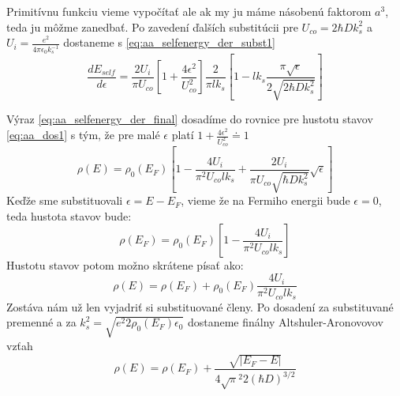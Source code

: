 Primitívnu funkciu vieme vypočítať ale ak my ju máme násobenú faktorom $a^3$, teda ju môžme zanedbať.
Po zavedení ďalších substitúcii pre $U_{co}=2\hbar D k_s^2$ a $U_i=\frac{e^2}{4\pi \epsilon_0 k_s^{-1}}$ dostaneme s
\eqref{eq:aa_selfenergy_der_subst1}
\begin{equation}
\label{eq:aa_selfenergy_der_final}
\frac{dE_{self}}{d\epsilon}=\frac{2 U_i}{\pi U_{co}}[1+\frac{4 \epsilon^2}{U_{co}^2}]\frac{2}{\pi l k_s}[1-l k_s \frac{\pi\sqrt\epsilon}{2\sqrt{2\hbar D k_s^2}}]
\end{equation}

Výraz \eqref{eq:aa_selfenergy_der_final} dosadíme do rovnice pre hustotu stavov \eqref{eq:aa_dos1} s tým, že
pre malé $\epsilon$ platí $1+\frac{4 \epsilon^2}{U_{co}^2}\doteq 1$
\begin{equation}
 \label{eq:aa_dos3}
 \rho(E)=\rho_0(E_F)[1-\frac{4 U_i}{\pi^2 U_{co} lk_s}+\frac{2U_i }{\pi U_{co} \sqrt{\hbar Dk_s^2}}\sqrt\epsilon ]
\end{equation}
Keďže sme substituovali $\epsilon=E-E_F$, vieme že na Fermiho energii bude $\epsilon=0$, teda hustota stavov bude:
\begin{equation}
 \label{eq:aa_dos_fermi}
 \rho(E_F)=\rho_0(E_F)[1-\frac{4 U_i}{\pi^2 U_{co} lk_s}]
\end{equation}
Hustotu stavov potom možno skrátene písať ako:
\begin{equation}
 \label{eq:aa_dos4}
 \rho(E)=\rho(E_F)+\rho_0(E_F)\frac{4 U_i}{\pi^2 U_{co} lk_s}
\end{equation}
Zostáva nám už len vyjadriť si substituované členy. Po dosadení za substituvané premenné a za
$k_s^2=\sqrt{e^2 2\rho_0(E_F)\epsilon_0}$ dostaneme finálny Altshuler-Aronovovov vzťah
\begin{equation}
 \label{eq:aa_dos_final}
 \rho(E)=\rho(E_F)+\frac{\sqrt{|E_F-E|}}{4\sqrt \pi^2 2 (\hbar D)^{3/2}}
\end{equation}

